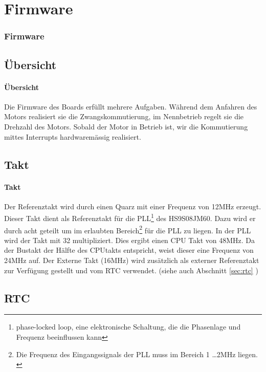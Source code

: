 \ifSTANDALONE
\section{Firmware}
\fi
\ifEMBED
\subsubsection{Firmware}
\label{sec:ET_Firmware}
\fi
\ifSTANDALONE
\subsection{Übersicht}
\fi
\ifEMBED
\paragraph{Übersicht}$~~$\vspace{2mm}\\
\fi
Die Firmware des Boards erfüllt mehrere Aufgaben. Während dem Anfahren des Motors realisiert
sie die Zwangskommutierung, im Nennbetrieb regelt sie die Drehzahl des
Motors. Sobald der Motor in Betrieb ist, wir die Kommutierung mittes Interrupts hardwaremässig
realisiert.
\ifSTANDALONE
\subsection{Takt}
\fi
\ifEMBED
\paragraph{Takt}$~~$\vspace{2mm}\\
\fi
Der Referenztakt wird durch einen Quarz mit einer Frequenz von 
12\si{\mega\hertz} erzeugt.  Dieser Takt dient als Referenztakt für die PLL\footnote{phase-locked loop, eine elektronische Schaltung, die die Phasenlage und Frequenz beeinflussen kann} 
des HS9S08JM60. Dazu wird er durch acht geteilt um im erlaubten 
Bereich\footnote{Die Frequenz des Eingangssignals der PLL muss im Bereich 1 
\ldots 2\si{\mega\hertz} liegen. \cite[p.  195]{Datasheet:HCS08}} für die PLL 
zu liegen. In der PLL wird der Takt mit 32 multipliziert. Dies ergibt einen 
CPU Takt von 48\si{\mega\hertz}. Da der Bustakt der Hälfte des CPUtakts 
entspricht, weist dieser eine Frequenz von 24\si{\mega\hertz} auf.  Der 
Externe Takt (16\si{\mega\hertz}) wird zusätzlich als externer Referenztakt 
zur Verfügung gestellt und vom RTC verwendet.  (siehe auch Abschnitt 
\ref{sec:rtc} )

\ifSTANDALONE
\subsection{RTC}
\fi
\ifEMBED
